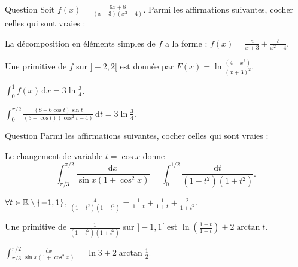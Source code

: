\begin{multi}[multiple,feedback=
{On v\'erifie que : \(\displaystyle f(x)=\frac{-2}{x+3}+\frac{1}{x-2}+\frac{1}{x+2}\). Donc, par linéarité,
\[\int f(x)\, \mathrm{d}x=\ln \left|\frac{(x^2-4)}{(x+3)^2}\right|+k,\; k\in \Rr.\]
Ainsi \(\displaystyle \int _{0}^1f(x)\, \mathrm{d}x=3\ln \frac{3}{4}\). Avec \(x=\cos t\), on a : \(\mathrm{d}x=-\sin t\, \mathrm{d}t\), \(x(0)=1\), \(x(\pi/2)=0\) et
\[\int _0^{\pi/2}\frac{(8+6\cos t)\sin t}{(3+\cos t)(\cos ^2t-4)}\, \mathrm{d}t=\int _0^1\frac{6x+8}{(x+3)(x^2-4)}\,\mathrm{d}x=3\ln \frac{3}{4}.\]
}]{Question}
Soit \(\displaystyle f(x)=\frac{6x+8}{(x+3)(x^2-4)}\). Parmi les affirmations suivantes, cocher celles qui sont vraies :

    \item La d\'ecomposition en éléments simples de \(f\) a la forme : \(\displaystyle f(x)=\frac{a}{x+3}+\frac{b}{x^2-4}\).
    \item* Une primitive de \(f\) sur \(]-2,2[\) est donn\'ee par \(\displaystyle F(x)=\ln \frac{(4-x^2)}{(x+3)^2}\).
    \item* \(\displaystyle \int _{0}^1f(x)\, \mathrm{d}x=3\ln \frac{3}{4}\).
    \item* \(\displaystyle \int _0^{\pi/2}\frac{(8+6\cos t)\sin t}{(3+\cos t)(\cos ^2t-4)}\, \mathrm{d}t=3\ln \frac{3}{4}\).
\end{multi}


\begin{multi}{Question}
Parmi les affirmations suivantes, cocher celles qui sont vraies :

    \item* Le changement de variable \(\displaystyle t=\cos x\) donne
\[\displaystyle \int _{\pi/3}^{\pi/2}\frac{\mathrm{d}x}{\sin x(1+\cos ^2x)}=\int _0^{1/2}\frac{\mathrm{d}t}{(1-t^2)(1+t^2)}.\]
    \item* \(\forall t\in \mathbb{R}\setminus \{-1,1\}\), \(\displaystyle \frac{4}{(1-t^2)(1+t^2)}=\frac{1}{1-t}+\frac{1}{1+t}+\frac{2}{1+t^2}\).
    \item Une primitive de \(\displaystyle \frac{1}{(1-t^2)(1+t^2)}\) sur \(]-1,1[\) est \(\displaystyle \ln \left(\frac{1+t}{1-t}\right)+2\arctan t\).
    \item \(\displaystyle \int _{\pi/3}^{\pi/2}\frac{\mathrm{d}x}{\sin x(1+\cos ^2x)}=\ln 3+2\arctan \frac{1}{2}\).
\end{multi}


